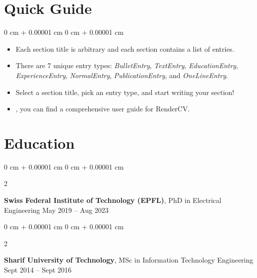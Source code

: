 \documentclass[10pt, a4paper]{article}
\newenvironment{highlightsforbulletentries}{
    \begin{itemize}[
        topsep=0.10 cm,
        parsep=0.10 cm,
        partopsep=0pt,
        itemsep=0pt,
        leftmargin=10pt
    ]
}{
    \end{itemize}
} %
\newenvironment{onecolentry}{
    \begin{adjustwidth}{
        0 cm + 0.00001 cm
    }{
        0 cm + 0.00001 cm
    }
}{
    \end{adjustwidth}
} %
\newenvironment{twocolentry}[2][]{
    \onecolentry
    \def\secondColumn{#2}
    \setcolumnwidth{\fill, 4.5 cm}
    \begin{paracol}{2}
}{
    \switchcolumn \raggedleft \secondColumn
    \end{paracol}
    \endonecolentry
} %
\let\hrefWithoutArrow\href
\renewcommand{\href}[2]{\hrefWithoutArrow{#1}{\ifthenelse{\equal{#2}{}}{ }{#2 }\raisebox{.15ex}{\footnotesize \faExternalLink*}}}
\begin{document}
    
    \section{Quick Guide}

    \begin{onecolentry}
        \begin{highlightsforbulletentries}


        \item Each section title is arbitrary and each section contains a list of entries.

        \item There are 7 unique entry types: \textit{BulletEntry}, \textit{TextEntry}, \textit{EducationEntry}, \textit{ExperienceEntry}, \textit{NormalEntry}, \textit{PublicationEntry}, and \textit{OneLineEntry}.

        \item Select a section title, pick an entry type, and start writing your section!

        \item \href{https://docs.rendercv.com/user_guide/}{Here}, you can find a comprehensive user guide for RenderCV.


        \end{highlightsforbulletentries}
    \end{onecolentry}

    \section{Education}



        
        \begin{twocolentry}{
            May 2019 – Aug 2023
        }
            \textbf{Swiss Federal Institute of Technology (EPFL)}, PhD in Electrical Engineering\end{twocolentry}



        \vspace{0.2 cm}

        \begin{twocolentry}{
            Sept 2014 – Sept 2016
        }
            \textbf{Sharif University of Technology}, MSc in Information Technology Engineering\end{twocolentry}



        \vspace{0.2 cm}
\end{document}
